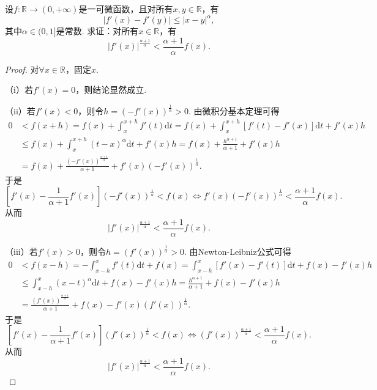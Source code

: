 \documentclass[../../main.tex]{subfiles}
\begin{document}
\begin{corollary}
设$f: \mathbb{R} \to (0, +\infty)$是一可微函数，且对所有$x, y \in \mathbb{R}$，有
$$|f'(x) - f'(y)| \leqslant |x - y|^\alpha,$$
其中$\alpha \in (0, 1]$是常数.
求证：对所有$x \in \mathbb{R}$，有
$$|f'(x)|^{\frac{\alpha + 1}{\alpha}} < \frac{\alpha + 1}{\alpha} f(x).$$
\end{corollary}
\begin{proof}
对$\forall x \in \mathbb{R}$，固定$x$.

（i）若$f'(x) = 0$，则结论显然成立.

（ii）若$f'(x) < 0$，则令$h = \left( -f'(x) \right)^{\frac{1}{\alpha}} > 0$. 由微积分基本定理可得
\begin{align*}
0 &< f(x + h) = f(x) + \int_x^{x + h} f'(t) \mathrm{d}t = f(x) + \int_x^{x + h} \left[ f'(t) - f'(x) \right] \mathrm{d}t + f'(x) h \\
&\leqslant f(x) + \int_x^{x + h} \left( t - x \right)^{\alpha} \mathrm{d}t + f'(x) h = f(x) + \frac{h^{\alpha + 1}}{\alpha + 1} + f'(x) h \\
&= f(x) + \frac{\left( -f'(x) \right)^{\frac{\alpha + 1}{\alpha}}}{\alpha + 1} + f'(x) \left( -f'(x) \right)^{\frac{1}{\alpha}}.
\end{align*}
于是
$$\left[ f'(x) - \frac{1}{\alpha + 1} f'(x) \right] \left( -f'(x) \right)^{\frac{1}{\alpha}} < f(x)\Longleftrightarrow f'(x) \left( -f'(x) \right)^{\frac{1}{\alpha}} < \frac{\alpha + 1}{\alpha} f(x).$$
从而
$$\left| f'(x) \right|^{\frac{\alpha + 1}{\alpha}} < \frac{\alpha + 1}{\alpha} f(x).$$

（iii）若$f'(x) > 0$，则令$h = \left( f'(x) \right)^{\frac{1}{\alpha}} > 0$. 由Newton-Leibniz公式可得
\begin{align*}
0 &< f(x - h) = -\int_{x - h}^x f'(t) \mathrm{d}t + f(x) = \int_{x - h}^x \left[ f'(x) - f'(t) \right] \mathrm{d}t + f(x) - f'(x) h \\
&\leqslant \int_{x - h}^x \left( x - t \right)^{\alpha} \mathrm{d}t + f(x) - f'(x) h = \frac{h^{\alpha + 1}}{\alpha + 1} + f(x) - f'(x) h \\
&= \frac{\left( f'(x) \right)^{\frac{\alpha + 1}{\alpha}}}{\alpha + 1} + f(x) - f'(x) \left( f'(x) \right)^{\frac{1}{\alpha}}.
\end{align*}
于是
$$\left[ f'(x) - \frac{1}{\alpha + 1} f'(x) \right] \left( f'(x) \right)^{\frac{1}{\alpha}} < f(x)\Longleftrightarrow \left( f'(x) \right)^{\frac{\alpha + 1}{\alpha}} < \frac{\alpha + 1}{\alpha} f(x).$$
从而
$$\left| f'(x) \right|^{\frac{\alpha + 1}{\alpha}} < \frac{\alpha + 1}{\alpha} f(x).$$

\end{proof}
\end{document}
